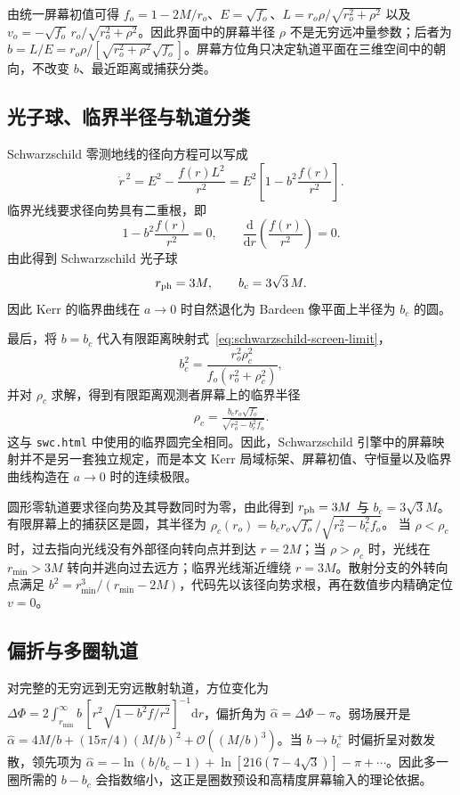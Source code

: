 \documentclass[UTF8,11pt,a4paper,fontset=fandol]{ctexart}
\newcommand{\dd}{\mathrm{d}}
\newcommand{\Order}{\mathcal O}
\begin{document}
由统一屏幕初值可得 \(f_o=1-2M/r_o\)、\(E=\sqrt{f_o}\)、\(L=r_o\rho/\sqrt{r_o^2+\rho^2}\) 以及 \(v_o=-\sqrt{f_o}\,r_o/\sqrt{r_o^2+\rho^2}\)。因此界面中的屏幕半径 \(\rho\) 不是无穷远冲量参数；后者为 \(b=L/E=r_o\rho/[\sqrt{r_o^2+\rho^2}\sqrt{f_o}]\)。屏幕方位角只决定轨道平面在三维空间中的朝向，不改变 \(b\)、最近距离或捕获分类。

\subsection{光子球、临界半径与轨道分类}
Schwarzschild 零测地线的径向方程可以写成
\[
\dot r^{\,2}
=E^2-\frac{f(r)L^2}{r^2}
=E^2
 \left[1-b^2\frac{f(r)}{r^2}\right].
\]
临界光线要求径向势具有二重根，即
\[
1-b^2\frac{f(r)}{r^2}=0,
\qquad
\frac{\dd}{\dd r}\left(\frac{f(r)}{r^2}\right)=0.
\]
由此得到 Schwarzschild 光子球
\[
r_{\rm ph}=3M,
\qquad
b_c=3\sqrt{3}\,M.
\]
因此 Kerr 的临界曲线在 \(a\to0\) 时自然退化为 Bardeen 像平面上半径为 \(b_c\) 的圆。

最后，将 \(b=b_c\) 代入有限距离映射式~\eqref{eq:schwarzschild-screen-limit}，
\[
b_c^2
=\frac{r_o^2\rho_c^2}
       {f_o(r_o^2+\rho_c^2)},
\]
并对 \(\rho_c\) 求解，得到有限距离观测者屏幕上的临界半径
\begin{align}
 \rho_c
 =\frac{b_c r_o\sqrt{f_o}}
 {\sqrt{r_o^2-b_c^2f_o}}.
 \label{eq:schwarzschild-critical-screen-limit}
\end{align}
这与 \texttt{swc.html} 中使用的临界圆完全相同。因此，Schwarzschild 引擎中的屏幕映射并不是另一套独立规定，而是本文 Kerr 局域标架、屏幕初值、守恒量以及临界曲线构造在 \(a\to0\) 时的连续极限。


圆形零轨道要求径向势及其导数同时为零，由此得到 \(r_{\rm ph}=3M\) 与 \(b_c=3\sqrt3M\)。有限屏幕上的捕获区是圆，其半径为 \(\rho_c(r_o)=b_c r_o\sqrt{f_o}/\sqrt{r_o^2-b_c^2f_o}\)。
当 \(\rho<\rho_c\) 时，过去指向光线没有外部径向转向点并到达 \(r=2M\)；当 \(\rho>\rho_c\) 时，光线在 \(r_{\min}>3M\) 转向并逃向过去远方；临界光线渐近缠绕 \(r=3M\)。散射分支的外转向点满足 \(b^2=r_{\min}^3/(r_{\min}-2M)\)，代码先以该径向势求根，再在数值步内精确定位 \(v=0\)。

\subsection{偏折与多圈轨道}

对完整的无穷远到无穷远散射轨道，方位变化为 \(\Delta\Phi=2\int_{r_{\min}}^\infty b\,[r^2\sqrt{1-b^2f/r^2}]^{-1}\dd r\)，偏折角为 \(\hat\alpha=\Delta\Phi-\pi\)。弱场展开是 \(\hat\alpha=4M/b+(15\pi/4)(M/b)^2+\Order((M/b)^3)\)。当 \(b\to b_c^+\) 时偏折呈对数发散，领先项为 \(\hat\alpha=-\ln(b/b_c-1)+\ln[216(7-4\sqrt3)]-\pi+\cdots\)\cite{Darwin1959,Bozza2002}。因此多一圈所需的 \(b-b_c\) 会指数缩小，这正是圈数预设和高精度屏幕输入的理论依据。
\end{document}

